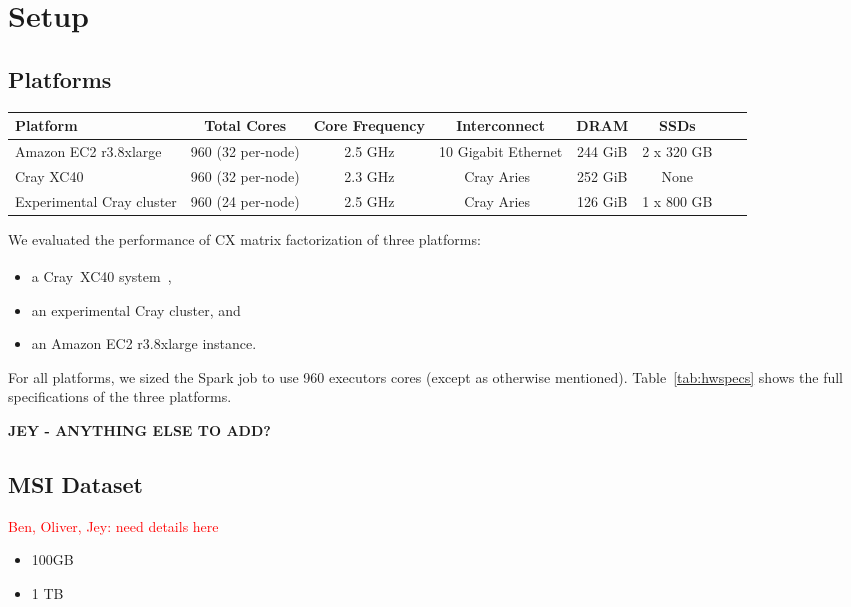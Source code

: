 \section{Setup}
\label{sec:setup}

\subsection{Platforms}

  \begin{table*}
    \begin{center}
    \begin{tabular}{| l | c | c | c | c | c | c | c |}
    \toprule
    \textbf{Platform} & \textbf{Total Cores} & \textbf{Core Frequency} & \textbf{Interconnect} & \textbf{DRAM} & \textbf{SSDs} \\
    \midrule
    Amazon EC2 r3.8xlarge & 960 (32 per-node) & 2.5 GHz & 10 Gigabit Ethernet & 244 GiB & 2 x 320 GB \\
    \midrule
    Cray XC40 & 960 (32 per-node) & 2.3 GHz & Cray Aries~\cite{alverson2012cray,craycascadesc12} & 252 GiB & None \\
    \midrule
    Experimental Cray cluster & 960 (24 per-node) & 2.5 GHz & Cray Aries~\cite{alverson2012cray,craycascadesc12} & 126 GiB & 1 x 800 GB \\
    \bottomrule
    \end{tabular}
    \end{center}
    \caption{Specifications of the three hardware platforms used in these performance experiments.}
    \label{tab:hwspecs}
  \end{table*}
  
 We evaluated the performance of CX matrix factorization of three platforms:
 \begin{itemize}
 \item a Cray\textregistered~XC40\textsuperscript{\tiny\texttrademark} 
 system~\cite{alverson2012cray,craycascadesc12},
 \item an experimental Cray cluster, and
 \item an Amazon EC2 r3.8xlarge instance.
 \end{itemize}
 For all platforms, we sized the Spark job to use 960 executors cores (except as otherwise mentioned).  Table~\ref{tab:hwspecs} shows the full specifications of the three platforms.
  
  \textbf{JEY - ANYTHING ELSE TO ADD?}

\subsection{MSI Dataset}
\textcolor{red}{Ben, Oliver, Jey: need details here}
\begin{itemize}
  \item 100GB
  \item 1 TB
\end{itemize}

